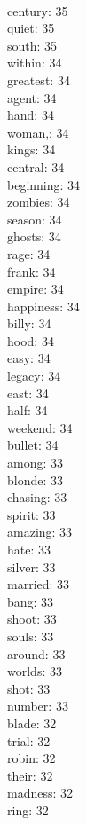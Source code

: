 \begin{multicols}{6}
  \\ century: 35
  \\ quiet: 35
  \\ south: 35
  \\ within: 34
  \\ greatest: 34
  \\ agent: 34
  \\ hand: 34
  \\ woman,: 34
  \\ kings: 34
  \\ central: 34
  \\ beginning: 34
  \\ zombies: 34
  \\ season: 34
  \\ ghosts: 34
  \\ rage: 34
  \\ frank: 34
  \\ empire: 34
  \\ happiness: 34
  \\ billy: 34
  \\ hood: 34
  \\ easy: 34
  \\ legacy: 34
  \\ east: 34
  \\ half: 34
  \\ weekend: 34
  \\ bullet: 34
  \\ among: 33
  \\ blonde: 33
  \\ chasing: 33
  \\ spirit: 33
  \\ amazing: 33
  \\ hate: 33
  \\ silver: 33
  \\ married: 33
  \\ bang: 33
  \\ shoot: 33
  \\ souls: 33
  \\ around: 33
  \\ worlds: 33
  \\ shot: 33
  \\ number: 33
  \\ blade: 32
  \\ trial: 32
  \\ robin: 32
  \\ their: 32
  \\ madness: 32
  \\ ring: 32

\end{multicols}
